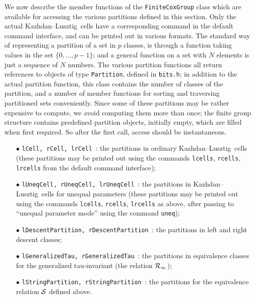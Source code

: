 \documentclass[11pt]{article}
\newcommand{\kl}{Kazh\-dan--Lusz\-tig}
\newcommand{\Rc}{{\cal R}}
\newcommand{\Sc}{{\cal S}}
\begin{document}
We now describe the member functions of the {\tt FiniteCoxGroup} class which
are available for accessing the various partitions defined in this section.
Only the actual \kl\ cells have a corresponding command in the default
command interface, and can be printed out in various formats. The standard
way of representing a partition of a set in $p$ classes, is through a function
taking values in the set $\{0,\ldots,p-1\}$; and a general function on a set 
with $N$ elements is just a sequence of $N$ numbers. The various partition
functions all return references to objects of type {\tt Partition}, defined
in {\tt bits.h}; in addition to the actual partition function, this class
contains the number of classes of the partition, and a number of member
functions for sorting and traversing partitioned sets conveniently. Since
some of these partitions may be rather expensive to compute, we avoid
computing them more than once; the finite group structure contains predefined
partition objects, initially empty, which are filled when first required. So
after the first call, access should be instantaneous.

\begin{itemize}\itemsep0pt
\item[$\bullet$]{\tt lCell, rCell, lrCell}~: the partitions in ordinary \kl\ 
cells (these partitions may be printed out using the commands {\tt lcells}, 
{\tt rcells}, {\tt lrcells} from the default command interface);
\item[$\bullet$]{\tt lUneqCell, rUneqCell, lrUneqCell}~: the partitions in 
\kl\ cells for unequal parameters (these partitions may be printed out
using the commands {\tt lcells}, {\tt rcells}, {\tt lrcells} as above, after 
passing to ``unequal parameter mode'' using the command {\tt uneq});
\item[$\bullet$]{\tt lDescentPartition, rDescentPartition}~: the partitions
in left and right descent classes;
\item[$\bullet$]{\tt lGeneralizedTau, rGeneralizedTau}~: the partitions in
equivalence classes for the generalized tau-invariant (the relation 
$\Rc_\infty$);
\item[$\bullet$]{\tt lStringPartition, rStringPartition}~: the partitions
for the equivalence relation $\Sc$ defined above.
\end{itemize}
\end{document}
